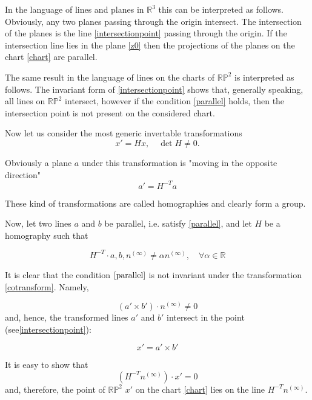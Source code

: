 \documentclass[a4paper,10pt]{article}
\begin{document}
In the language of lines and planes in $\mathbb{R}^3$ this can be interpreted as follows. Obviously, any two planes passing through the origin intersect. The intersection of the planes is the line \eqref{intersectionpoint} passing through the origin. If the intersection line lies in the plane \eqref{z0} then the projections of the planes on the chart \eqref{chart} are parallel.

The same result in the language of lines on the charts of $\mathbb{RP}^2$ is interpreted as  follows. The invariant form of \eqref{intersectionpoint} shows that, generally speaking, all lines on $\mathbb{RP}^2$ intersect, however if the condition \eqref{parallel} holds, then the intersection point is not  present on the considered chart.

Now let us consider the most generic invertable transformations 
\begin{equation}
x' = H x, \quad \det H \neq 0. 
\end{equation}

Obviously a plane $a$ under this transformation  is "moving in the opposite direction"
\begin{equation}
a'=H^{-T}a\label{cotransform}
\end{equation}

These kind of transformations are called homographies and clearly form a group. 

Now, let two lines $a$ and $b$ be parallel, i.e. satisfy \eqref{parallel},  and let $H$ be a homography such that

\begin{equation}
H^{-T} \cdot a,b,n^{(\infty)}  \neq \alpha n^{(\infty)} , \quad \forall \alpha \in \mathbb{R}
\end{equation}

 It is clear that the condition $\eqref{parallel}$ is not invariant under the transformation \eqref{cotransform}. Namely,

\begin{equation}
(a'\times b')\cdot  n^{(\infty)} \neq 0
\end{equation} 
 and, hence, the transformed lines $a'$ and $b'$ intersect in the point (see\eqref{intersectionpoint}):

\begin{equation}
x' = a' \times b'
\end{equation}

It is easy to show that 
\begin{equation}
(H^{-T}n^{(\infty)}) \cdot x'  = 0
\end{equation}
and, therefore, the point of $\mathbb{RP}^2$ $x'$ on the chart \eqref{chart} lies on the line $H^{-T}n^{(\infty)}$. 
\end{document}
